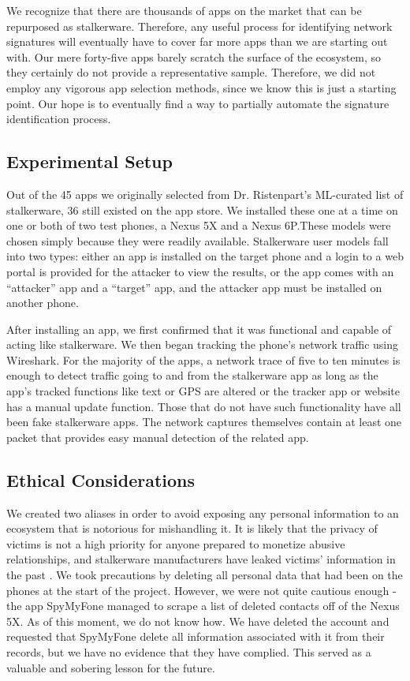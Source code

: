 \documentclass[acmtog]{acmart}
\begin{document}
We recognize that there are thousands of apps on the market that can be 
repurposed as stalkerware. Therefore, any useful process for identifying 
network signatures will eventually have to cover far more apps than we are 
starting out with. Our mere forty-five apps barely scratch the surface of the 
ecosystem, so they certainly do not provide a representative sample. Therefore, 
we did not employ any vigorous app selection methods, since we know this is 
just a starting point. Our hope is to eventually find a way to partially 
automate the signature identification process.

\subsection{Experimental Setup}
Out of the 45 apps we originally selected from Dr. Ristenpart's ML-curated list 
of stalkerware, 36 still existed on the app store. We installed these one at a 
time on one or both of two test phones, a Nexus 5X and a Nexus 6P.These models 
were chosen simply because they were readily available. Stalkerware user 
models  fall into two types: either an app is installed on the target phone and 
a login to a web portal is provided for the attacker to view the results, or 
the app comes with an ``attacker'' app and a ``target'' app, and the attacker 
app must be installed on another phone.

After installing an app, we first confirmed that it was functional and capable 
of acting like stalkerware. 
We then began tracking the phone's network traffic using Wireshark. For the 
majority of the apps, a network trace 
of five to ten minutes is enough to detect traffic going to and from the 
stalkerware app as long as the app's tracked functions like text or GPS are 
altered or the tracker app or website has a manual update function. Those that 
do not have such functionality have all been fake stalkerware apps. The network 
captures themselves contain at least one packet that provides easy manual 
detection of the related app.

\subsection{Ethical Considerations}

We created two aliases in order to avoid exposing any personal information to 
an ecosystem that is notorious for mishandling it\cite{ristenpart_ucsd_talk}. 
It is likely that the privacy of victims is 
not a high priority for anyone prepared to monetize abusive relationships, and 
stalkerware manufacturers have leaked victims' information in the past 
\cite{koebler_stalkerware_2018}. We took precautions by deleting all personal 
data that had been on the phones at the start of the project. However, we were 
not quite cautious enough - the app SpyMyFone managed to scrape a list of 
deleted contacts off of the Nexus 5X. As of this moment, we do not know how. We 
have deleted the account and requested that SpyMyFone delete all information 
associated with it from their records, but we have no evidence that they have 
complied. This served as a valuable and sobering lesson for the future.
\end{document}
